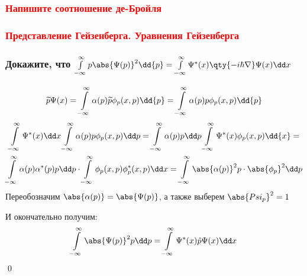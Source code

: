 \subsubsection{\textcolor{red} {Напишите соотношение де-Бройля} }
\subsubsection{\textcolor{red} {Представление Гейзенберга. Уравнения Гейзенберга} }
\subsubsection{Докажите, что $\infint p \abs{\Psi(p)}^2\dd{p}=\infint\Psi^*(x)\qty{-i\hbar\nabla}\Psi(x)\dd x$}


$$\tilde p\Psi(x)=\infint \alpha(p)\tilde p \phi_p(x,p)\dd{p}=\infint\alpha(p) p\phi_p(x,p)\dd{p}$$
\begin{gather*}
	\infint \Psi^*(x)\dd x\infint \alpha(p) p \phi_p(x,p)\dd p=
	\infint \alpha(p)p\dd p \infint \Psi^* (x) \phi_p(x,p) \dd{x}=
	\\
	\infint \alpha(p) \alpha^*(p) p \dd p \cdot \infint \phi_p(x,p) \phi^*_p(x,p) \dd x=\infint \abs{\alpha(p)}^2 p\cdot \abs{\phi_p}^2 \dd p
\end{gather*}
Переобозначим $\abs{\alpha(p)}=\abs{\Psi(p)}$, а также выберем $\abs{Psi_p}^2=1$

И окончательно получим:
$$\infint \abs{\Psi(p)}^2 p \dd p = \infint \Psi^*(x) \hat p \Psi(x) \dd x $$
\qed